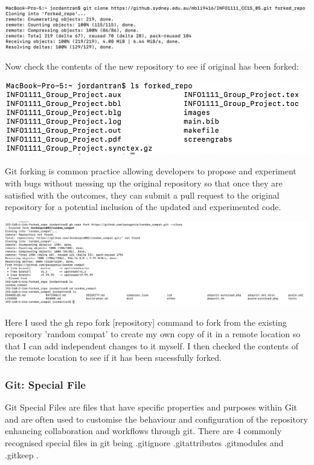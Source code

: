 \documentclass[a4paper, 11pt]{report}
\begin{document}
\includegraphics[width=\textwidth]{cloning}

Now check the contents of the new repository to see if original has been forked:

\includegraphics[width=\textwidth]{fork_repo}

Git forking is common practice allowing developers to propose and experiment with bugs without messing up the original repository so that once they are satisfied with the outcomes,  they can submit a pull request to the original repository for a potential inclusion of the updated and experimented code. 

\includegraphics[width=\textwidth]{git_fork}

Here I used the gh repo fork [repository] command to fork from the existing repository 'random compat' to create my own copy of it in a remote location so that I can add independent changes to it myself. I then checked the contents of the remote location to see if it has been sucessfully forked.

\subsubsection{Git: Special File}

Git Special Files are files that have specific properties and purposes within Git and are often used to customise the behaviour and configuration of the repository enhancing collaboration and workflows through git. There are 4 commonly recognised special files in git being .gitignore .gitattributes .gitmodules and .gitkeep \cite {medium} . 
\end{document}
